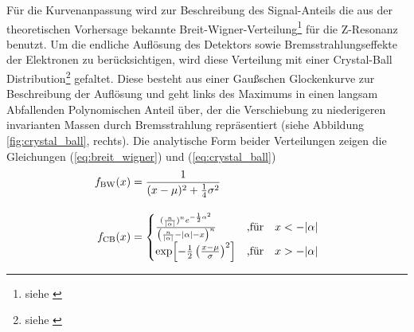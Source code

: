 Für die Kurvenanpassung wird zur Beschreibung des Signal-Anteils die aus der
theoretischen Vorhersage bekannte Breit-Wigner-Verteilung\footnote{siehe
\cite{PhysRev.49.519}} für die Z-Resonanz benutzt. Um die endliche Auflösung
des Detektors sowie Bremsstrahlungseffekte der Elektronen zu berücksichtigen,
wird diese Verteilung mit einer Crystal-Ball Distribution\footnote{siehe
\cite[Appendix F]{Gaiser:1982yw}} gefaltet. Diese besteht aus einer Gaußschen
Glockenkurve zur Beschreibung der Auflösung und geht links des Maximums in
einen langsam Abfallenden Polynomischen Anteil über, der die Verschiebung zu
niederigeren invarianten Massen durch Bremsstrahlung repräsentiert (siehe
Abbildung \ref{fig:crystal_ball}, rechts). Die analytische Form beider
Verteilungen zeigen die Gleichungen (\ref{eq:breit_wigner}) und
(\ref{eq:crystal_ball}) 
\begin{align}
    f_\text{BW}(x) &= \frac{1}{(x-\mu)^2+\frac{1}{4}\sigma^2}
    \label{eq:breit_wigner}\\[10pt]
    f_\text{CB}(x) &=
        \begin{cases}
            \frac{(\frac{n}{|\alpha|})^n e^{-\frac{1}{2}\alpha^2}}
                 {\left( \frac{n}{|\alpha|}-|\alpha|-x \right)^n}
                & \text{,für}\quad x < -|\alpha| \\
            \exp\Bigl[-\frac{1}{2}\left( \frac{x-\mu}{\sigma} \right)^2 \Bigr]
                & \text{,für}\quad x > -|\alpha|
        \end{cases}
    \label{eq:crystal_ball}
\end{align}


